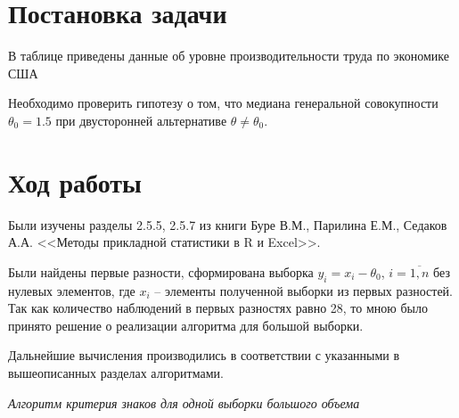 \section{Постановка задачи}

В таблице приведены данные об уровне производительности труда по экономике США


Необходимо проверить гипотезу о том, что медиана генеральной совокупности $\theta_0 = 1.5$ при двусторонней альтернативе $\theta \ne \theta_0$.

\section{Ход работы}

Были изучены разделы 2.5.5, 2.5.7 из книги Буре В.М., Парилина Е.М., Седаков А.А. <<Методы прикладной статистики в R и Excel>>.

Были найдены первые разности, сформирована выборка $y_i = x_i - \theta_0$, $i = \overline{1, n}$ без нулевых элементов, где $x_i$ -- элементы полученной выборки из первых разностей. Так как количество наблюдений в первых разностях равно 28, то мною было принято решение о реализации алгоритма для большой выборки.

Дальнейшие вычисления производились в соответствии с указанными в вышеописанных разделах алгоритмами.

\textit{Алгоритм критерия знаков для одной выборки большого объема}

